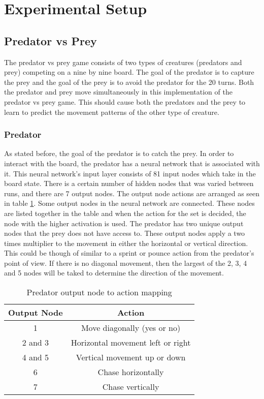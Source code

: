 \section{Experimental Setup}
\subsection{Predator vs Prey}
	The predator vs prey game consists of two types of creatures (predators and prey) competing on a nine by nine board. The goal of the predator is to capture the prey and the goal of the prey is to avoid the predator for the 20 turns.  Both the predator and prey move simultaneously in this implementation of the predator vs prey game. This should cause both the predators and the prey to learn to predict the movement patterns of the other type of creature. 

\subsubsection{Predator}
		As stated before, the goal of the predator is to catch the prey. In order to interact with the board, the predator has a neural network that is associated with it. This neural network’s input layer consists of 81 input nodes which take in the board state. There is a certain number of hidden nodes that was varied between runs, and there are 7 output nodes. The output node actions are arranged as seen in table \ref{tab:pred-actions}. Some output nodes in the neural network are connected. These nodes are listed together in the table and when the action for the set is decided, the node with the higher activation is used. The predator has two unique output nodes that the prey does not have access to. These output nodes apply a two times multiplier to the movement in either the horizontal or vertical direction. This could be though of similar to a sprint or pounce action from the predator's point of view. If there is no diagonal movement, then the largest of the 2, 3, 4 and 5 nodes will be taked to determine the direction of the movement.
				
\begin{table}
  \centering
  \begin{tabular}{|c|c|}
    \hline
    Output Node & Action \\
    \hline
    1 & Move diagonally (yes or no)\\
    2 and 3 & Horizontal movement left or right \\
    4 and 5 & Vertical movement up or down \\
    6 & Chase horizontally \\
    7 & Chase vertically \\
    \hline
  \end{tabular}
  \caption{Predator output node to action mapping}
  \label{tab:pred-actions}
\end{table}

